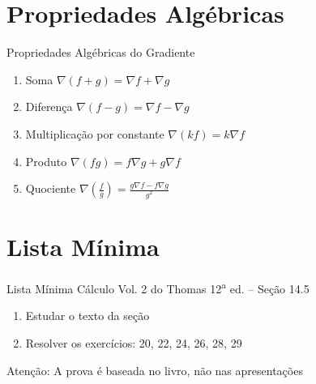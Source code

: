 



\section{Propriedades Algébricas}

\begin{frame}{Propriedades Algébricas do Gradiente}
  \begin{enumerate}[<+->]
    \setlength\itemsep{1.5em}
    \item Soma                        \tabto{55mm} \(\nabla(f+g) = \nabla f + \nabla g\)
    \item Diferença                   \tabto{55mm} \(\nabla(f-g) = \nabla f - \nabla g\)
    \item Multiplicação por constante \tabto{55mm} \(\nabla(kf) = k\nabla f\)
    \item Produto                     \tabto{55mm} \(\nabla(fg) = f\nabla g + g\nabla f\)
    \item Quociente                   \tabto{55mm}
      \(\nabla\left(\frac{f}{g}\right) = \frac{g\nabla f - f\nabla g}{g^2}\)
  \end{enumerate}
\end{frame}



\section{Lista Mínima}

\begin{frame}{Lista Mínima}
  Cálculo Vol. 2 do Thomas 12\textsuperscript{a} ed. -- Seção 14.5
  \begin{enumerate}
    \item Estudar o texto da seção
    \item Resolver os exercícios: 20, 22, 24, 26, 28, 29
  \end{enumerate}

  \vfill
  Atenção: A prova é baseada no livro, não nas apresentações
\end{frame}


